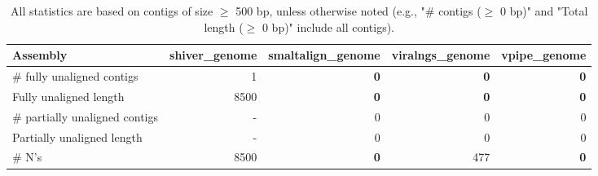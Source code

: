 \documentclass[12pt,a4paper]{article}
\begin{document}
\begin{table}[ht]
\begin{center}
\caption{All statistics are based on contigs of size $\geq$ 500 bp, unless otherwise noted (e.g., "\# contigs ($\geq$ 0 bp)" and "Total length ($\geq$ 0 bp)" include all contigs).}
\begin{tabular}{|l*{4}{|r}|}
\hline
Assembly & shiver\_genome & smaltalign\_genome & viralngs\_genome & vpipe\_genome \\ \hline
\# fully unaligned contigs & 1 & {\bf 0} & {\bf 0} & {\bf 0} \\ \hline
Fully unaligned length & 8500 & {\bf 0} & {\bf 0} & {\bf 0} \\ \hline
\# partially unaligned contigs & - & 0 & 0 & 0 \\ \hline
Partially unaligned length & - & 0 & 0 & 0 \\ \hline
\# N's & 8500 & {\bf 0} & 477 & {\bf 0} \\ \hline
\end{tabular}
\end{center}
\end{table}
\end{document}
